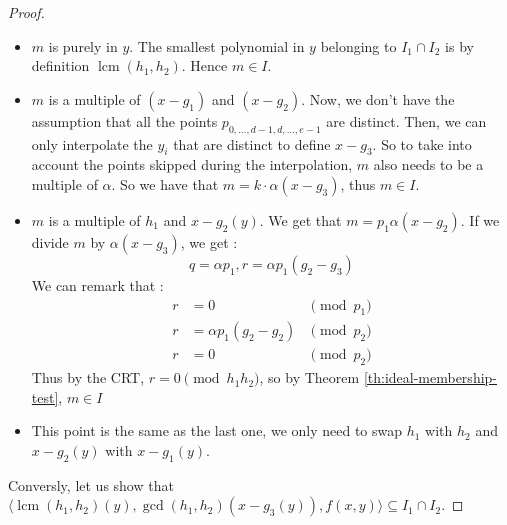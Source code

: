 \documentclass{article}
\DeclareMathOperator{\lcm}{lcm}
\begin{document}
\begin{flushleft}
\begin{proof}
    \begin{itemize}
        \item $m$ is purely in $y$. The smallest polynomial in $y$ belonging to $I_{1} \cap I_{2}$ is by definition $\lcm(h_{1}, h_{2})$. Hence $m \in I$.
        \item $m$ is a multiple of $(x - g_{1})$ and $(x - g_{2})$. Now, we don't have the assumption that all the points $p_{0,\dots,d-1,d,\dots,e-1}$ are distinct. Then, we can only interpolate the $y_{i}$ that are distinct to define $x - g_{3}$. So to take into account the points skipped during the interpolation, $m$ also needs to be a multiple of $\alpha$. So we have that $m = k \cdot \alpha (x - g_{3})$, thus $m \in I$. 
        \item $m$ is a multiple of $h_{1}$ and $x - g_{2}(y)$. We get that $m = p_{1} \alpha (x - g_{2})$. If we divide $m$ by $\alpha (x - g_{3})$, we get : 
        \begin{displaymath}
            q = \alpha p_{1}, r = \alpha p_{1} (g_{2} - g_{3})
        \end{displaymath}
        We can remark that :
        \begin{align*}
            r & = 0 & \pmod{p_{1}} \\
            r & = \alpha p_{1} (g_{2} - g_{2}) & \pmod {p_{2}} \\
            r & = 0 & \pmod {p_{2}}
        \end{align*}
        Thus by the CRT, $r = 0 \pmod{h_{1}h_{2}}$, so by Theorem \ref{th:ideal-membership-test}, $m \in I$
        \item This point is the same as the last one, we only need to swap $h_{1}$ with $h_{2}$ and $x - g_{2}(y)$ with $x - g_{1}(y)$.
        
    \end{itemize} 
    Conversly, let us show that $\langle \lcm(h_{1}, h_{2})(y), \gcd(h_{1},h_{2})(x - g_{3}(y)), f(x,y) \rangle \subseteq I_{1} \cap I_{2}$.


\end{proof}
\end{flushleft}
\end{document}
